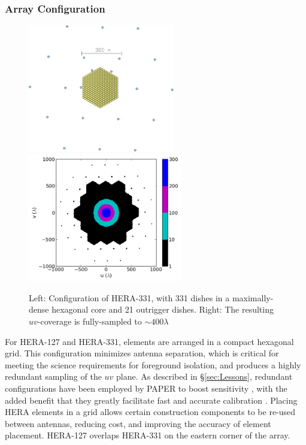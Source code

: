 \documentclass[preprint]{aastex}
\newcommand{\compress}{\vspace{-0.3in}}
\begin{document}
\compress
\subsubsection{Array Configuration}

\begin{figure}[t]
\centering
		\includegraphics[height=2.2in]{plots/hera352rot.png}
		\includegraphics[height=2.2in]{plots/HERA_331_uv_clipped.png}
\caption{\small
Left: Configuration of HERA-331, with 331 dishes in a maximally-dense hexagonal core and 21 outrigger dishes.  Right: The resulting $uv$-coverage is fully-sampled to $\sim 400\lambda$ 
}\label{fig:uv_coverage}
\end{figure}

For HERA-127 and HERA-331, elements are arranged in a compact hexagonal grid.
This configuration minimizes antenna separation, which is critical for meeting
the science requirements for foreground isolation, and 
produces a highly redundant sampling of the $uv$ plane.  As described in
\S\ref{sec:Lessons}, redundant configurations have been employed by PAPER to
boost sensitivity \citep{parsons_et_al2012a}, with the added benefit that they
greatly facilitate fast and accurate calibration
\citep{liu_et_al2010,parsons_et_al2013}.  Placing HERA elements in a
grid allows certain construction components to be re-used between antennas,
reducing cost, and improving the accuracy of element placement.  HERA-127 
overlaps HERA-331 on the eastern
corner of the array.
\end{document}

